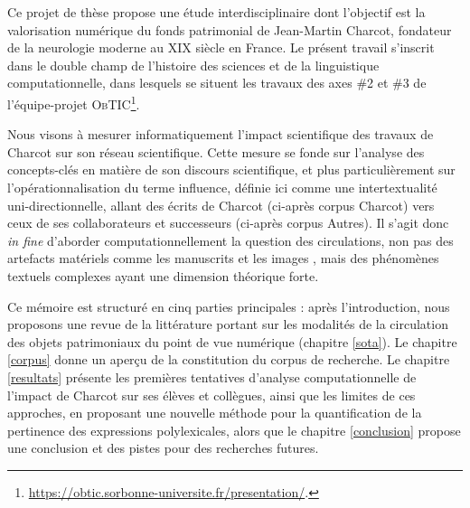 Ce projet de thèse propose une étude interdisciplinaire dont l'objectif est la valorisation numérique du fonds patrimonial de Jean-Martin Charcot, fondateur de la neurologie moderne au XIX\ieme{} siècle en France. 
Le présent travail s'inscrit dans le double champ de l'histoire des sciences et de la linguistique computationnelle, dans lesquels se situent les travaux des axes \#2 et \#3 de l'équipe-projet \textsc{ObTIC}\footnote{\url{https://obtic.sorbonne-universite.fr/presentation/}.}.

Nous visons à mesurer informatiquement l'impact scientifique des travaux de Charcot sur son réseau scientifique. Cette mesure se fonde sur l'analyse des concepts-clés en matière de son discours scientifique, et plus particulièrement sur l'opérationnalisation du terme \og{}influence\fg{}, définie ici comme une intertextualité uni-directionnelle, allant des écrits de Charcot (ci-après corpus \og{}Charcot\fg{}) vers ceux de ses collaborateurs et successeurs (ci-après corpus \og{}Autres\fg{}). Il s'agit donc \textit{in fine} d'aborder computationnellement la question des circulations, non pas des artefacts matériels comme les manuscrits \citep{gabay2021katabase} et les images \citep{joyeux2019visual}, mais des phénomènes textuels complexes \citep{manjavacas} ayant une dimension théorique forte.

Ce mémoire est structuré en cinq parties principales : après l'introduction, nous proposons une revue de la littérature portant sur les modalités de la circulation des objets patrimoniaux du point de vue numérique (chapitre \ref{sota}). Le chapitre \ref{corpus} donne un aperçu de la constitution du corpus de recherche. Le chapitre \ref{resultats} présente les premières tentatives d'analyse computationnelle de l'impact de Charcot sur ses élèves et collègues, ainsi que les limites de ces approches, en proposant une nouvelle méthode pour la quantification de la pertinence des expressions polylexicales, alors que le chapitre \ref{conclusion} propose une conclusion et des pistes pour des recherches futures.










